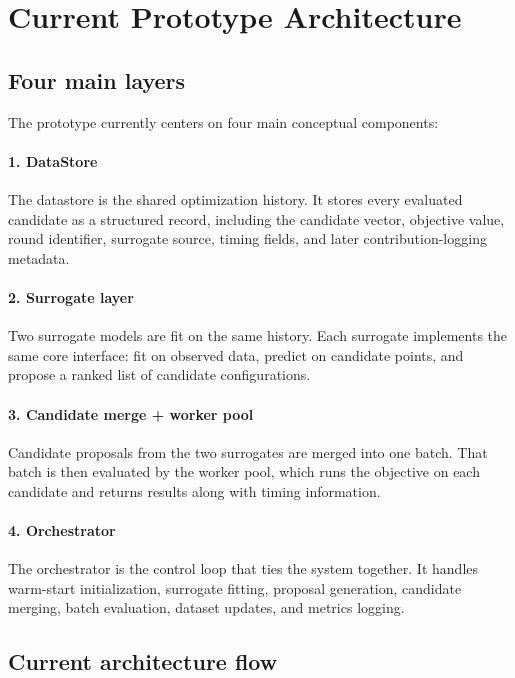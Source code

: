\documentclass[11pt]{article}
\begin{document}
\section{Current Prototype Architecture}

\subsection{Four main layers}

The prototype currently centers on four main conceptual components:

\paragraph{1. DataStore}
The datastore is the shared optimization history. It stores every evaluated candidate as a structured record, including the candidate vector, objective value, round identifier, surrogate source, timing fields, and later contribution-logging metadata.

\paragraph{2. Surrogate layer}
Two surrogate models are fit on the same history. Each surrogate implements the same core interface: fit on observed data, predict on candidate points, and propose a ranked list of candidate configurations.

\paragraph{3. Candidate merge + worker pool}
Candidate proposals from the two surrogates are merged into one batch. That batch is then evaluated by the worker pool, which runs the objective on each candidate and returns results along with timing information.

\paragraph{4. Orchestrator}
The orchestrator is the control loop that ties the system together. It handles warm-start initialization, surrogate fitting, proposal generation, candidate merging, batch evaluation, dataset updates, and metrics logging.

\subsection{Current architecture flow}
\end{document}
